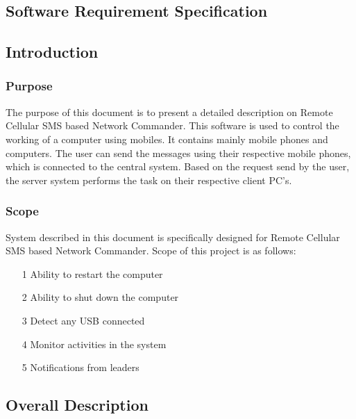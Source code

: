 \begin{center}
\section{Software Requirement Specification}
\end{center}
\paragraph{}
\subsection{Introduction}
\subsubsection{Purpose}
The purpose of this document is to present a detailed description on Remote Cellular
SMS based Network Commander. This software is used to control the working of a
computer using mobiles. It contains mainly mobile phones and computers. The user can
send the messages using their respective mobile phones, which is connected to the central
system. Based on the request send by the user, the server system performs the task on
their respective client PC's.
\subsubsection{Scope}
System described in this document is specifically designed for Remote Cellular SMS
based Network Commander. Scope of this project is as follows:
\begin{itemize}
\item[1]Ability to restart the computer
\item[2]Ability to shut down the computer
\item[3]Detect any USB connected
\item[4]Monitor activities in the system
\item[5]Notifications from leaders
\end{itemize}
\subsection{Overall Description}
